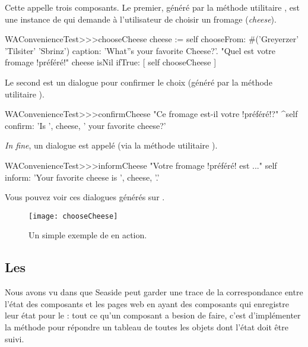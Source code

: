 \documentclass[a4paper,10pt,twoside]{book}
\begin{document}
Cette \task appelle trois composants.
Le premier, généré par la méthode utilitaire
, est une instance de
 qui demande à l'utilisateur de choisir un
fromage (\emph{cheese}).

\begin{code}{}
WAConvenienceTest>>>chooseCheese
	cheese := self
		chooseFrom: #('Greyerzer' 'Tilsiter' 'Sbrinz')
		caption: 'What''s your favorite Cheese?'. "Quel est votre fromage !préféré!"
	cheese isNil ifTrue: [ self chooseCheese ]
\end{code}


Le second est un dialogue  pour confirmer le
choix (généré par la méthode utilitaire ).

\begin{code}{}
WAConvenienceTest>>>confirmCheese
    "Ce fromage est-il votre !préféré!?"
	^self confirm: 'Is ', cheese,  ' your favorite cheese?'
\end{code}

\emph{In fine}, un dialogue  est appelé (via la
méthode utilitaire ).

\begin{code}{}
WAConvenienceTest>>>informCheese
    "Votre fromage !préféré! est ..."
	self inform: 'Your favorite cheese is ', cheese, '.'
\end{code}

Vous pouvez voir ces dialogues générés sur .

\begin{figure}[ht]
\begin{center}
\texttt{[image: chooseCheese]}
\caption{Un simple exemple de \task en action.}
\end{center}
\end{figure}

\subsection{Les \transactions} %

Nous avons vu dans  que Seaside peut garder une
trace de la correspondance entre l'état des composants et les pages
web en ayant des composants qui enregistre leur état pour le
\backtracking:
tout ce qu'un composant a besion de faire, c'est d'implémenter la
méthode  pour répondre un tableau de toutes les objets dont
l'état doit être suivi.
\end{document}
